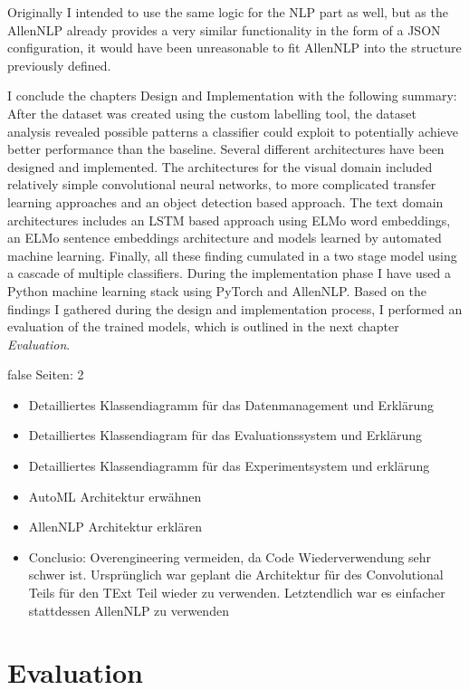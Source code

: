 \documentclass[draft,final,oneside]{vutinfth} %
\begin{document}
Originally I intended to use the same logic for the NLP part as well, but as the AllenNLP already provides a very similar functionality in the form of a JSON configuration, it would have been unreasonable to fit AllenNLP into the structure previously defined.

I conclude the chapters Design and Implementation with the following summary: After the dataset was created using the custom labelling tool, the dataset analysis revealed possible patterns a classifier could exploit to potentially achieve better performance than the baseline. Several different architectures have been designed and implemented. The architectures for the visual domain included relatively simple convolutional neural networks, to more complicated transfer learning approaches and an object detection based approach. The text domain architectures includes an LSTM based approach using ELMo word embeddings, an ELMo sentence embeddings architecture and models learned by automated machine learning. Finally, all these finding cumulated in a two stage model using a cascade of multiple classifiers. During the implementation phase I have used a Python machine learning stack using PyTorch and AllenNLP. Based on the findings I gathered during the design and implementation process, I performed an evaluation of the trained models, which is outlined in the next chapter \textit{Evaluation}.


\if false
Seiten: 2

\begin{itemize}

\item Detailliertes Klassendiagramm für das Datenmanagement und Erklärung
\item Detailliertes Klassendiagram für das Evaluationssystem und Erklärung
\item Detailliertes Klassendiagramm für das Experimentsystem und erklärung 
\item AutoML Architektur erwähnen
\item AllenNLP Architektur erklären
\item Conclusio: Overengineering vermeiden, da Code Wiederverwendung sehr schwer ist. Ursprünglich war geplant die Architektur für des Convolutional Teils für den TExt Teil wieder zu verwenden. Letztendlich war es einfacher stattdessen AllenNLP zu verwenden

\end{itemize}

\fi


\chapter{Evaluation} \label{evaluationchapter}
\end{document}
